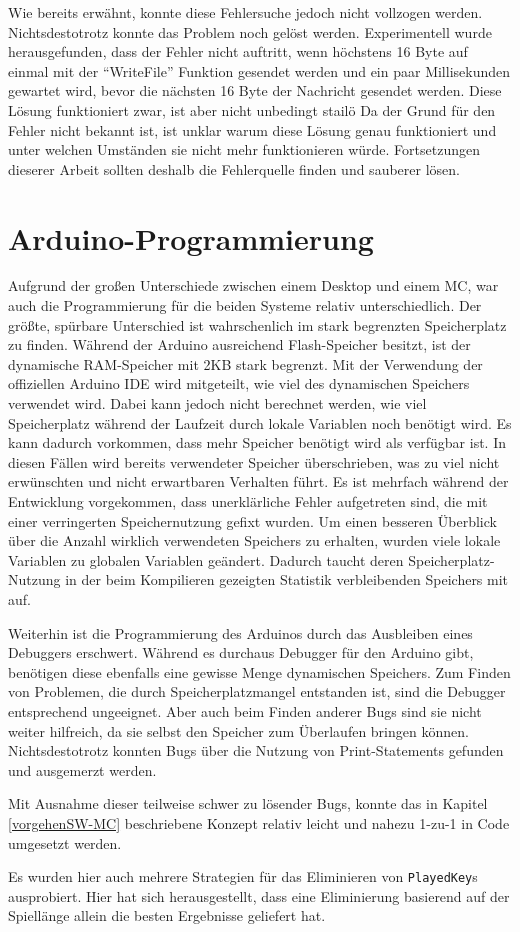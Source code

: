 Wie bereits erwähnt, konnte diese Fehlersuche jedoch nicht vollzogen werden.
Nichtsdestotrotz konnte das Problem noch gelöst werden.
Experimentell wurde herausgefunden, dass der Fehler nicht auftritt, wenn höchstens 16 Byte auf einmal mit der \enquote{WriteFile} Funktion gesendet werden und ein paar Millisekunden gewartet wird, bevor die nächsten 16 Byte der Nachricht gesendet werden.
Diese Lösung funktioniert zwar, ist aber nicht unbedingt stailö
Da der Grund für den Fehler nicht bekannt ist, ist unklar warum diese Lösung genau funktioniert und unter welchen Umständen sie nicht mehr funktionieren würde.
Fortsetzungen dieserer Arbeit sollten deshalb die Fehlerquelle finden und sauberer lösen.


\section{Arduino-Programmierung} \label{umsetzungSW-MC}

Aufgrund der großen Unterschiede zwischen einem Desktop und einem \ac{MC}, war auch die Programmierung für die beiden Systeme relativ unterschiedlich.
Der größte, spürbare Unterschied ist wahrschenlich im stark begrenzten Speicherplatz zu finden.
Während der Arduino ausreichend Flash-Speicher besitzt, ist der dynamische RAM-Speicher mit 2KB stark begrenzt.
Mit der Verwendung der offiziellen Arduino IDE wird mitgeteilt, wie viel des dynamischen Speichers verwendet wird.
Dabei kann jedoch nicht berechnet werden, wie viel Speicherplatz während der Laufzeit durch lokale Variablen noch benötigt wird.
Es kann dadurch vorkommen, dass mehr Speicher benötigt wird als verfügbar ist.
In diesen Fällen wird bereits verwendeter Speicher überschrieben, was zu viel nicht erwünschten und nicht erwartbaren Verhalten führt.
Es ist mehrfach während der Entwicklung vorgekommen, dass unerklärliche Fehler aufgetreten sind, die mit einer verringerten Speichernutzung gefixt wurden.
Um einen besseren Überblick über die Anzahl wirklich verwendeten Speichers zu erhalten, wurden viele lokale Variablen zu globalen Variablen geändert.
Dadurch taucht deren Speicherplatz-Nutzung in der beim Kompilieren gezeigten Statistik verbleibenden Speichers mit auf.

Weiterhin ist die Programmierung des Arduinos durch das Ausbleiben eines Debuggers erschwert.
Während es durchaus Debugger für den Arduino gibt, benötigen diese ebenfalls eine gewisse Menge dynamischen Speichers.
Zum Finden von Problemen, die durch Speicherplatzmangel entstanden ist, sind die Debugger entsprechend ungeeignet.
Aber auch beim Finden anderer Bugs sind sie nicht weiter hilfreich, da sie selbst den Speicher zum Überlaufen bringen können.
Nichtsdestotrotz konnten Bugs über die Nutzung von Print-Statements gefunden und ausgemerzt werden.

Mit Ausnahme dieser teilweise schwer zu lösender Bugs, konnte das in Kapitel \ref{vorgehenSW-MC} beschriebene Konzept relativ leicht und nahezu 1-zu-1 in Code umgesetzt werden.

Es wurden hier auch mehrere Strategien für das Eliminieren von \lstinline|PlayedKey|s ausprobiert.
Hier hat sich herausgestellt, dass eine Eliminierung basierend auf der Spiellänge allein die besten Ergebnisse geliefert hat.
